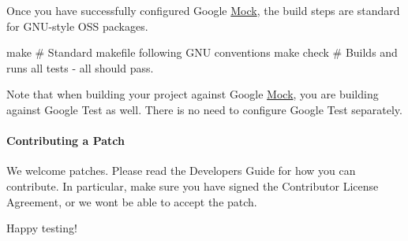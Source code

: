 Once you have successfully configured Google \mbox{\hyperlink{class_mock}{Mock}}, the build steps are standard for G\+N\+U-\/style O\+SS packages. \begin{DoxyVerb}make        # Standard makefile following GNU conventions
make check  # Builds and runs all tests - all should pass.
\end{DoxyVerb}


Note that when building your project against Google \mbox{\hyperlink{class_mock}{Mock}}, you are building against Google Test as well. There is no need to configure Google Test separately.

\paragraph*{Contributing a Patch}

We welcome patches. Please read the Developer\textquotesingle{}s Guide for how you can contribute. In particular, make sure you have signed the Contributor License Agreement, or we won\textquotesingle{}t be able to accept the patch.

Happy testing! 
